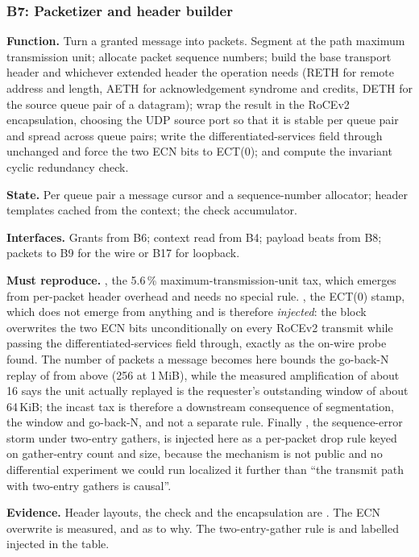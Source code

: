 \subsubsection{B7: Packetizer and header builder}

\textbf{Function.} Turn a granted message into packets. Segment at the path
maximum transmission unit; allocate packet sequence numbers; build the base
transport header and whichever extended header the operation needs (RETH for
remote address and length, AETH for acknowledgement syndrome and credits, DETH
for the source queue pair of a datagram); wrap the result in the RoCEv2
encapsulation, choosing the UDP source port so that it is stable per queue pair
and spread across queue pairs; write the differentiated-services field through
unchanged and force the two ECN bits to ECT(0); and compute the invariant
cyclic redundancy check.

\textbf{State.} Per queue pair a message cursor and a sequence-number
allocator; header templates cached from the context; the check accumulator.

\textbf{Interfaces.} Grants from B6; context read from B4; payload beats from
B8; packets to B9 for the wire or B17 for loopback.

\textbf{Must reproduce.} , the 5.6\,\% maximum-transmission-unit tax,
which emerges from per-packet header overhead and needs no special rule.
, the ECT(0) stamp, which does not emerge from anything and is
therefore \emph{injected}: the block overwrites the two ECN bits
unconditionally on every RoCEv2 transmit while passing the
differentiated-services field through, exactly as the on-wire probe found. The
number of packets a message becomes here bounds the go-back-N replay of
 from above (256 at 1\,MiB), while the measured amplification of
about 16 says the unit actually replayed is the requester's outstanding
window of about 64\,KiB; the incast tax is therefore a downstream consequence
of segmentation, the window and go-back-N, and not a separate rule. Finally
, the sequence-error storm under two-entry gathers, is injected here
as a per-packet drop rule keyed on gather-entry count and size, because the
mechanism is not public and no differential experiment we could run localized
it further than ``the transmit path with two-entry gathers is causal''.

\textbf{Evidence.} Header layouts, the check and the encapsulation are
\evdoc{}. The ECN overwrite is measured, and \evcal{} as to why. The
two-entry-gather rule is \evdecl{} and labelled injected in the table.


